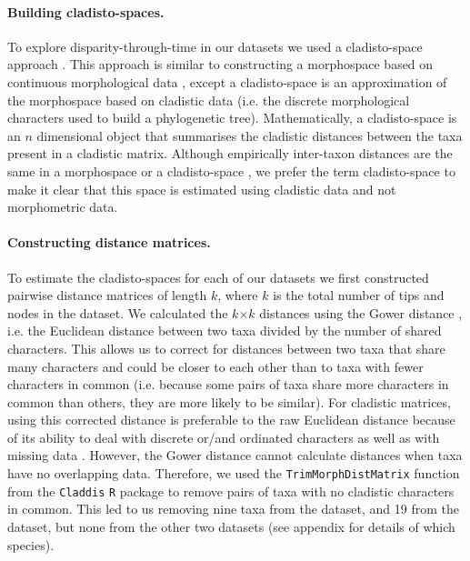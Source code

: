 \documentclass[12pt,a4paper]{article}
\begin{document}
\paragraph{Building cladisto-spaces.} 
To explore disparity-through-time in our datasets we used a cladisto-space approach \citep[e.g.][]{Foote01071994,Foote29111996,Wesley-Hunt2005,Brusatte12092008,friedmanexplosive2010,toljagictriassic-jurassic2013,Hughes20082013}.
This approach is similar to constructing a morphospace based on continuous morphological data \citep[e.g.][]{friedmanexplosive2010}, except a cladisto-space is an approximation of the morphospace based on cladistic data (i.e. the discrete morphological characters used to build a phylogenetic tree).
Mathematically, a cladisto-space is an $n$ dimensional object that summarises the cladistic distances between the taxa present in a cladistic matrix.
Although empirically inter-taxon distances are the same in a morphospace or a cladisto-space \citep{foth2012different,hetherington2015cladistic}, we prefer the term cladisto-space to make it clear that this space is estimated using cladistic data and not morphometric data.

\paragraph{Constructing distance matrices.}
To estimate the cladisto-spaces for each of our datasets we first constructed pairwise distance matrices of length $k$, where $k$ is the total number of tips and nodes in the dataset.
We calculated the $k$$\times$$k$ distances using the Gower distance \citep{Gower71}, i.e. the Euclidean distance between two taxa divided by the number of shared characters. 
This allows us to correct for distances between two taxa that share many characters and could be closer to each other than to taxa with fewer characters in common (i.e. because some pairs of taxa share more characters in common than others, they are more likely to be similar).
For cladistic matrices, using this corrected distance is preferable to the raw Euclidean distance because of its ability to deal with discrete or/and ordinated characters as well as with missing data \citep{anderson2012using}.
However, the Gower distance cannot calculate distances when taxa have no overlapping data.
Therefore, we used the \texttt{TrimMorphDistMatrix} function from the \texttt{Claddis} \texttt{R} package \citep{Claddis} to remove pairs of taxa with no cladistic characters in common.
This led to us removing nine taxa from the \cite{bapst2016topology} dataset, and 19 from the \cite{brusatte2014gradual} dataset, but none from the other two datasets (see appendix for details of which species). %
\end{document}
